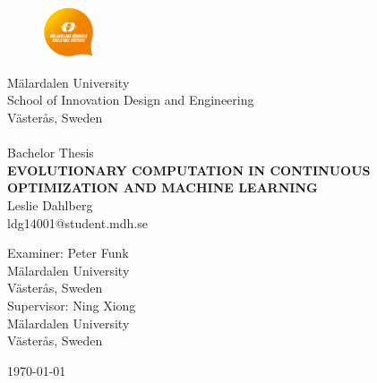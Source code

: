 
\begin{center}
		\begin{figure}[t]
				\includegraphics[width=15mm, bb=0 0 100 100]{MDHlogga.png}
		\end{figure}
                 	\Large M\"{a}lardalen University \\
			\Large School of Innovation Design and Engineering \\
                        \Large V\"{a}ster\r{a}s, Sweden\\

                        \noindent\makebox[\linewidth]{\rule{\textwidth}{0.4pt}}\\[0.5cm]

                \Large{Bachelor Thesis}\\[2.0cm]

			\huge \textbf{\uppercase{Evolutionary computation in continuous optimization and machine learning}} \\ [2.5cm] %

			\LARGE Leslie Dahlberg \\
        	\large ldg14001@student.mdh.se \\[2.5cm]

\begin{flushleft}
			\Large Examiner: Peter Funk\\[0.5cm]
			\Large M\"{a}lardalen University\\
			\Large V\"{a}ster\r{a}s, Sweden\\[1.0cm]

			\Large Supervisor: Ning Xiong\\[0.5cm]
			\Large M\"{a}lardalen University\\
			\Large V\"{a}ster\r{a}s, Sweden\\[0.5cm]

\end{flushleft}

              \vspace*{\fill}
                    \large \today		%

\end{center}
